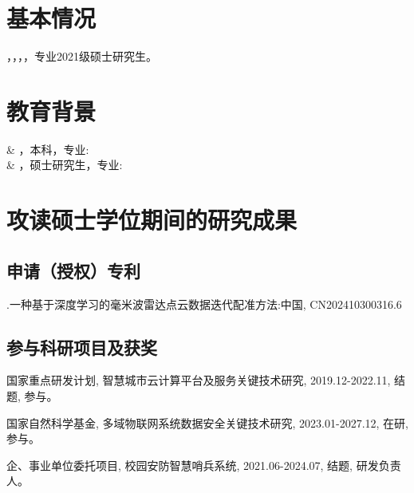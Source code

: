\section{基本情况} ，，，，专业2021级硕士研究生。 
\section{教育背景}
\begin{edubg}
 & ，本科，专业:\\
& ，硕士研究生，专业:\\
\end{edubg}
\section{攻读硕士学位期间的研究成果}
\subsection{申请（授权）专利}
\begin{resresult}
	\item {}.一种基于深度学习的毫米波雷达点云数据迭代配准方法:中国, CN202410300316.6
\end{resresult}

\subsection{参与科研项目及获奖}
\begin{resresult}
	\item 国家重点研发计划, 智慧城市云计算平台及服务关键技术研究, 2019.12-2022.11, 结题, 参与。
	\item 国家自然科学基金, 多域物联网系统数据安全关键技术研究, 2023.01-2027.12, 在研, 参与。
	\item 企、事业单位委托项目, 校园安防智慧哨兵系统, 2021.06-2024.07, 结题, 研发负责人。

\end{resresult}
